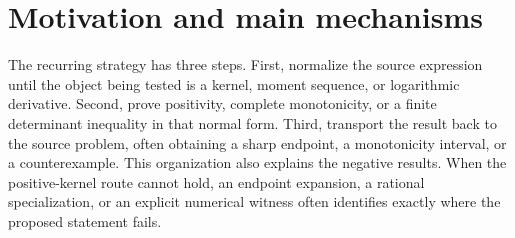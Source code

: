 \section{Motivation and main mechanisms}
The recurring strategy has three steps.  First, normalize the source expression until the object being tested is a kernel, moment sequence, or logarithmic derivative.  Second, prove positivity, complete monotonicity, or a finite determinant inequality in that normal form.  Third, transport the result back to the source problem, often obtaining a sharp endpoint, a monotonicity interval, or a counterexample.
This organization also explains the negative results.  When the positive-kernel route cannot hold, an endpoint expansion, a rational specialization, or an explicit numerical witness often identifies exactly where the proposed statement fails.
